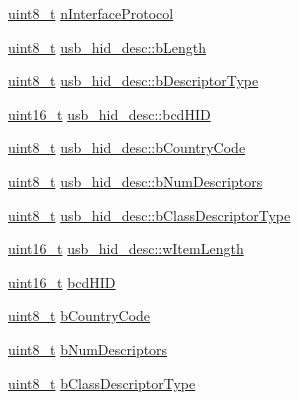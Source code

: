 \begin{DoxyCompactItemize}
\hyperlink{stdint_8h_aba7bc1797add20fe3efdf37ced1182c5}{uint8\-\_\-t} \hyperlink{group___p_i_o_s___u_s_b___d_e_f_s_ga056d861642d341ddff9b5b6bb5b24ea9}{n\-Interface\-Protocol}
\item 
\hyperlink{stdint_8h_aba7bc1797add20fe3efdf37ced1182c5}{uint8\-\_\-t} \hyperlink{group___p_i_o_s___u_s_b___d_e_f_s_ga738612f01d93af966dfd2e9fbf29e409}{usb\-\_\-hid\-\_\-desc\-::b\-Length}
\item 
\hyperlink{stdint_8h_aba7bc1797add20fe3efdf37ced1182c5}{uint8\-\_\-t} \hyperlink{group___p_i_o_s___u_s_b___d_e_f_s_ga6fd7eaaf97d6f887fb38056456f79038}{usb\-\_\-hid\-\_\-desc\-::b\-Descriptor\-Type}
\item 
\hyperlink{stdint_8h_a273cf69d639a59973b6019625df33e30}{uint16\-\_\-t} \hyperlink{group___p_i_o_s___u_s_b___d_e_f_s_gab7e8d21f875c12e9ed7715a78fe5bb9e}{usb\-\_\-hid\-\_\-desc\-::bcd\-H\-I\-D}
\item 
\hyperlink{stdint_8h_aba7bc1797add20fe3efdf37ced1182c5}{uint8\-\_\-t} \hyperlink{group___p_i_o_s___u_s_b___d_e_f_s_gadbef4d9e2e13fd696fcf8339ee1a27b3}{usb\-\_\-hid\-\_\-desc\-::b\-Country\-Code}
\item 
\hyperlink{stdint_8h_aba7bc1797add20fe3efdf37ced1182c5}{uint8\-\_\-t} \hyperlink{group___p_i_o_s___u_s_b___d_e_f_s_ga5bce1598e0b04efe977788e2027fde3a}{usb\-\_\-hid\-\_\-desc\-::b\-Num\-Descriptors}
\item 
\hyperlink{stdint_8h_aba7bc1797add20fe3efdf37ced1182c5}{uint8\-\_\-t} \hyperlink{group___p_i_o_s___u_s_b___d_e_f_s_ga25fe14740813f95e5163aeb719b36d35}{usb\-\_\-hid\-\_\-desc\-::b\-Class\-Descriptor\-Type}
\item 
\hyperlink{stdint_8h_a273cf69d639a59973b6019625df33e30}{uint16\-\_\-t} \hyperlink{group___p_i_o_s___u_s_b___d_e_f_s_ga86359b23d6a148a291cb15cab529444b}{usb\-\_\-hid\-\_\-desc\-::w\-Item\-Length}
\item 
\hyperlink{stdint_8h_a273cf69d639a59973b6019625df33e30}{uint16\-\_\-t} \hyperlink{group___p_i_o_s___u_s_b___d_e_f_s_gacf09c753851ce018b81a07325bda9d8e}{bcd\-H\-I\-D}
\item 
\hyperlink{stdint_8h_aba7bc1797add20fe3efdf37ced1182c5}{uint8\-\_\-t} \hyperlink{group___p_i_o_s___u_s_b___d_e_f_s_ga969a604033b72573d59a740badf6920e}{b\-Country\-Code}
\item 
\hyperlink{stdint_8h_aba7bc1797add20fe3efdf37ced1182c5}{uint8\-\_\-t} \hyperlink{group___p_i_o_s___u_s_b___d_e_f_s_ga86ff434026085d9c0c751185eb3700c5}{b\-Num\-Descriptors}
\item 
\hyperlink{stdint_8h_aba7bc1797add20fe3efdf37ced1182c5}{uint8\-\_\-t} \hyperlink{group___p_i_o_s___u_s_b___d_e_f_s_ga66fbce7af1dc0d0340807d24f01187bb}{b\-Class\-Descriptor\-Type}

\end{DoxyCompactItemize}
